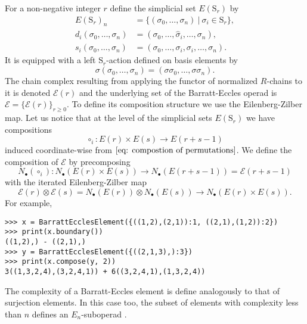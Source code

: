 \documentclass{amsart}
\renewcommand{\S}{\mathrm S}
\begin{document}
For a non-negative integer $r$ define the simplicial set $E(\mathrm S_r)$ by
\begin{align*}
E(\mathrm S_r)_n &= \{ (\sigma_0, \dots, \sigma_n)\ |\ \sigma_i \in \mathrm{S}_r\}, \\
d_i(\sigma_0, \dots, \sigma_n) &= (\sigma_0, \dots, \widehat{\sigma}_i, \dots, \sigma_n), \\
s_i(\sigma_0, \dots, \sigma_n) &= (\sigma_0, \dots, \sigma_i, \sigma_i, \dots, \sigma_n).
\end{align*}
It is equipped with a left $\mathrm S_r$-action defined on basis elements by
\begin{equation*}
\sigma (\sigma_0, \dots, \sigma_n) = (\sigma \sigma_0, \dots, \sigma \sigma_n).
\end{equation*}
The chain complex resulting from applying the functor of normalized $R$-chains to it is denoted $\mathcal E(r)$ and the underlying set of the Barratt-Eccles operad is $\mathcal E = \{\mathcal E(r)\}_{r\geq0}$. To define its composition structure we use the Eilenberg-Zilber map. Let us notice that at the level of the simplicial sets $E(\S_r)$ we have compositions
\begin{equation*}
{\circ}_{i}: E(r) \times E(s) \to E(r + s - 1)
\end{equation*}
induced coordinate-wise from $\eqref{eq: compostion of permutations}$.
We define the composition of $\mathcal E$ by precomposing
\begin{equation*}
N_\bullet(\circ_i) \colon N_\bullet(E(r) \times E(s))
\longrightarrow
N_\bullet(E(r + s - 1)) = \mathcal E(r+s-1)
\end{equation*}
with the iterated Eilenberg-Zilber map
\begin{equation*}
\mathcal E(r) \otimes \mathcal E(s) =
N_\bullet(E(r)) \otimes N_\bullet(E(s))
\longrightarrow
N_\bullet(E(r) \times E(s)).
\end{equation*}
For example,
\begin{verbatim}
>>> x = BarrattEcclesElement({((1,2),(2,1)):1, ((2,1),(1,2)):2})
>>> print(x.boundary())
((1,2),) - ((2,1),)
>>> y = BarrattEcclesElement({((2,1,3),):3})
>>> print(x.compose(y, 2))
3((1,3,2,4),(3,2,4,1)) + 6((3,2,4,1),(1,3,2,4))
\end{verbatim}

The complexity of a Barratt-Eccles element is define analogously to that of surjection elements. In this case too, the subset of elements with complexity less than $n$ defines an $E_n$-suboperad \cite{BergerFresse04}.
\end{document}
